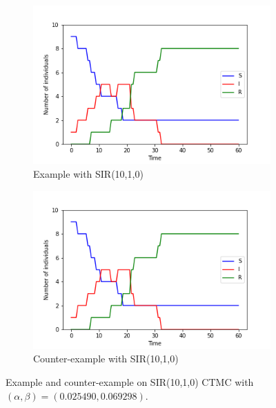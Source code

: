 \begin{figure}[H]
    \centering
    \begin{subfigure}{0.48\textwidth}
        \centering
        \includegraphics[width=\linewidth]{figures/sir_1010_trace_1.png}
        \caption{Example with SIR(10,1,0)}
    \end{subfigure}
    \hfill
    \begin{subfigure}{0.48\textwidth}
        \centering
        \includegraphics[width=\linewidth]{figures/sir_1010_trace_1.png}
        \caption{Counter-example with SIR(10,1,0)}
    \end{subfigure}
    \caption{Example and counter-example on SIR(10,1,0) CTMC with $(\alpha, \beta)=(0.025490, 0.069298)$.}
\end{figure}
